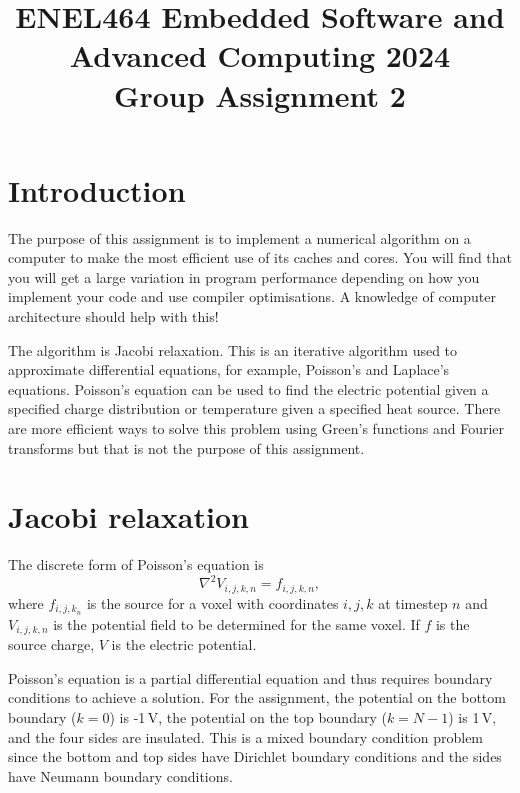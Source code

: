 \documentclass[a4paper,11pt]{article}
\begin{document}
\title{\bf ENEL464 Embedded Software and Advanced Computing 2024 \\ Group Assignment 2}
\author{}
\date{}
\maketitle


\section{Introduction}

The purpose of this assignment is to implement a numerical algorithm
on a computer to make the most efficient use of its caches and cores.
You will find that you will get a large variation in program
performance depending on how you implement your code and use compiler
optimisations.  A knowledge of computer architecture should help with
this!

The algorithm is Jacobi relaxation.  This is an iterative algorithm
used to approximate differential equations, for example, Poisson's and
Laplace's equations.  Poisson's equation can be used to find the
electric potential given a specified charge distribution or
temperature given a specified heat source.  There are more efficient
ways to solve this problem using Green's functions and Fourier
transforms but that is not the purpose of this assignment.

\section{Jacobi relaxation}

The discrete form of Poisson's equation is
%
\begin{equation}
  \nabla^2 V_{i,j,k,n} = f_{i,j,k,n},
\end{equation}
%
where $f_{i,j,k_n}$ is the source for a voxel with coordinates $i,j,k$
at timestep $n$ and $V_{i,j,k,n}$ is the potential field to be
determined for the same voxel.  If $f$ is the source charge, $V$ is
the electric potential.

Poisson's equation is a partial differential equation and thus
requires boundary conditions to achieve a solution.  For the
assignment, the potential on the bottom boundary ($k=0$) is -1\,V, the
potential on the top boundary ($k=N-1$) is 1\,V, and the four sides
are insulated.  This is a mixed boundary condition problem since the
bottom and top sides have Dirichlet boundary conditions and the sides
have Neumann boundary conditions.
\end{document}

